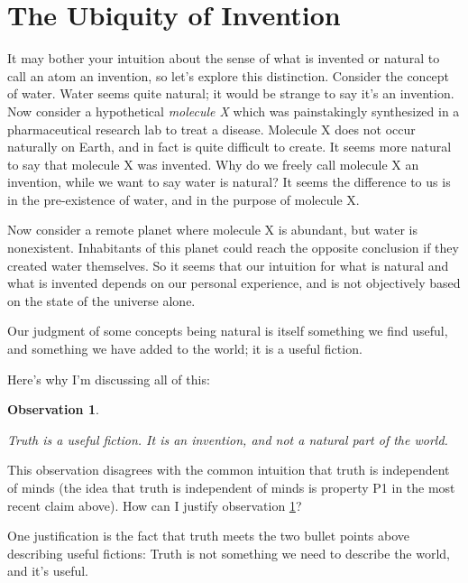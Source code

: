 \documentclass[9pt, twoside]{book}
\newtheorem{obs}{Observation}
\theoremstyle{argtstyle}
\begin{document}
\section{The Ubiquity of Invention}

It may bother your intuition about the sense of what is invented or natural
to call an atom an invention, so let's explore this distinction.
Consider the concept of water.
Water seems quite natural;
it would be strange to say it's an invention.
Now consider a hypothetical {\em molecule X} which was painstakingly synthesized
in a pharmaceutical research lab to treat a disease.
Molecule X does not occur naturally on Earth,
and in fact is quite difficult to create. It seems more natural to say that
molecule X was invented.
Why do we freely call molecule X an invention, while we want to say
water is natural?
It seems the difference to us is in the pre-existence of water, and
in the purpose of molecule X.

Now consider a remote planet where molecule X is abundant, but water is
nonexistent. Inhabitants of this planet could reach the opposite conclusion if
they created water themselves. So it seems that our intuition for what is
natural and what is invented depends on our personal experience, and is
not objectively based on the state of the universe alone.

Our judgment of some concepts being natural is itself something
we find useful, and something we have added to the world; it is a useful
fiction.

Here's why I'm discussing all of this:
\newcommand{\obsthree}{
    Truth is a useful fiction. It is an invention, and not a natural part of the
    world.
}
\begin{obs}\label{o3}
    \obsthree
\end{obs}

This observation disagrees with the common intuition that truth is
independent of minds (the idea that truth is independent of minds is
property P1 in the most recent claim above).
How can I justify observation \ref{o3}?

One justification is the fact that truth meets the two bullet points
above describing useful fictions:
Truth is not something we need to describe the world, and it's useful.
\end{document}
